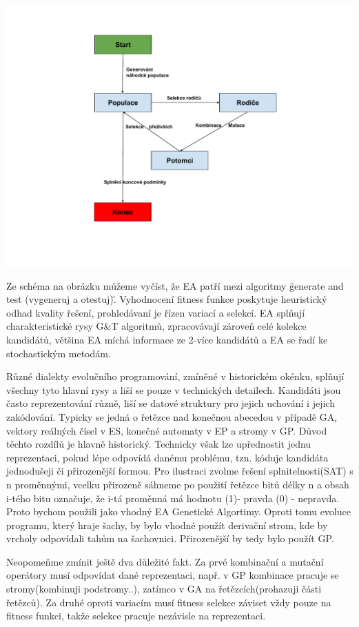 \begin{center}
\includegraphics[scale=0.63]{../img/EA.pdf}
\end{center}
Ze schéma na obrázku můžeme vyčíst, že EA patří mezi algoritmy \"generate and test (vygeneruj a otestuj)\". Vyhodnocení fitness funkce poskytuje heuristický odhad kvality řešení, prohledávaní je řízen variací a selekcí. EA splňují charakteristické rysy G\&T algoritmů, zpracovávají zároveň celé kolekce kandidátů, většina EA míchá informace ze 2-více kandidátů a EA se řadí ke stochastickým metodám. \par
Různé dialekty evolučního programování, zmíněné v historickém okénku, splňují všechny tyto hlavní rysy a liší se pouze v technických detailech. Kandidáti jsou často reprezentování různě, liší se datové struktury pro jejich uchování i jejich zakódování. Typicky se jedná o řetězce nad konečnou abecedou v případě GA, vektory reálných čísel v ES, konečné automaty v EP a stromy v GP. Důvod těchto rozdílů je hlavně historický. Technicky však lze upřednostit jednu reprezentaci, pokud lépe odpovídá danému problému, tzn. kóduje kandidáta jednodušeji či přirozenější formou. Pro ilustraci zvolme řešení splnitelnosti(SAT) s n proměnnými, vcelku přirozeně sáhneme po použití řetězce bitů délky n a obsah i-tého bitu označuje, že i-tá proměnná má hodnotu (1)- pravda (0) - nepravda. Proto bychom použili jako vhodný EA Genetické Algortimy. Oproti tomu evoluce programu, který hraje šachy, by bylo vhodné použít derivační strom, kde by vrcholy odpovídali tahům na šachovnici. Přirozenější by tedy bylo použít GP. \par
Neopomeňme zmínit ještě dva důležité fakt. Za prvé kombinační a mutační operátory musí odpovídat dané reprezentaci, např. v GP kombinace pracuje se stromy(kombinuji podstromy..), zatímco v GA na řetězcích(prohazuji části řetězců). Za druhé oproti variacím musí fitness selekce záviset vždy pouze na fitness funkci, takže selekce pracuje nezávisle na reprezentaci.

